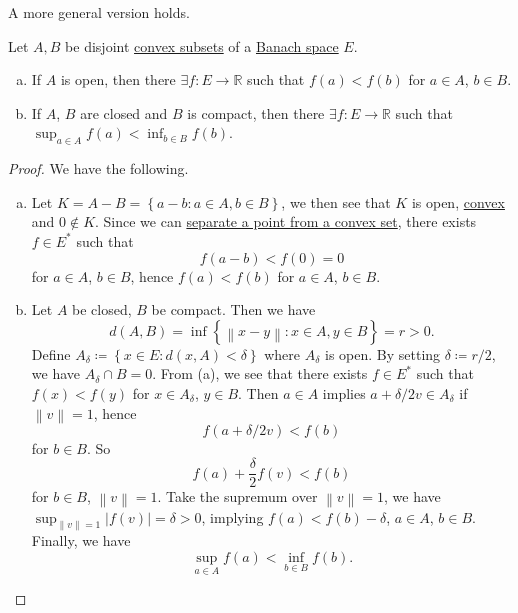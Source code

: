 A more general version holds.

\begin{theorem}\label{thm:separation-of-convex-sets}
	Let \(A, B\) be disjoint \hyperref[def:convex-set]{convex subsets} of a \hyperref[def:Banach-space]{Banach space} \(E\).
	\begin{enumerate}[(a)]
		\item If \(A\) is open, then there \(\exists f\colon E\to \mathbb{R} \) such that \(f(a) < f(b)\) for \(a\in A\), \(b\in B\).
		\item If \(A\), \(B\) are closed and \(B\) is compact, then there \(\exists f\colon E\to \mathbb{R} \) such that \(\sup _{a\in A} f(a) < \inf _{b\in B}f(b)\).
	\end{enumerate}
\end{theorem}
\begin{proof}
	We have the following.
	\begin{enumerate}[(a)]
		\item Let \(K = A - B = \left\{ a - b\colon a\in A, b\in B \right\} \), we then see that \(K\) is open, \hyperref[def:convex-set]{convex} and \(0 \notin K\). Since we can \hyperref[thm:separation-of-a-point-from-a-convex-set]{separate a point from a convex set}, there exists \(f\in E^{\ast} \) such that
		      \[
			      f(a - b) < f(0) = 0
		      \]
		      for \(a\in A\), \(b\in B\), hence \(f(a) < f(b)\) for \(a\in A\), \(b\in B\).
		\item Let \(A\) be closed, \(B\) be compact. Then we have
		      \[
			      d(A, B) = \inf \left\{ \left\lVert x-y\right\rVert \colon x\in A, y\in B \right\} = r > 0.
		      \]
		      Define \(A_\delta \coloneqq \left\{ x\in E\colon d(x, A) < \delta  \right\} \) where \(A_\delta \) is open. By setting \(\delta \coloneqq r / 2\), we have \(A_\delta \cap B = 0\). From (a), we see that there exists \(f\in E^{\ast} \) such that \(f(x) < f(y)\) for \(x\in A_\delta \), \(y\in B\). Then \(a\in A\) implies \(a + \delta /2 v \in A_\delta \) if \(\left\lVert v\right\rVert = 1\), hence
		      \[
			      f(a + \delta / 2 v)< f(b)
		      \]
		      for \(b\in B\). So
		      \[
			      f(a) + \frac{\delta }{2}f(v) < f(b)
		      \]
		      for \(b\in B\), \(\left\lVert v\right\rVert = 1\). Take the supremum over \(\left\lVert v\right\rVert = 1\), we have \(\sup _{\left\lVert v\right\rVert = 1} \left\vert f(v) \right\vert = \delta > 0\), implying \(f(a) < f(b) - \delta \), \(a\in A\), \(b\in B\). Finally, we have
		      \[
			      \sup _{a\in A}f(a) < \inf _{b\in B}f(b).
		      \]
	\end{enumerate}
\end{proof}